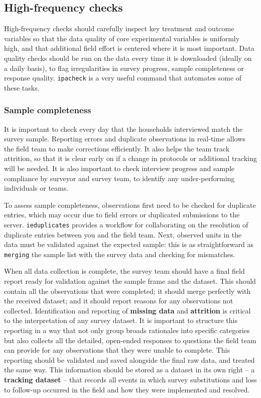 \subsection{High-frequency checks}
High-frequency checks should carefully inspect key treatment and outcome variables so that the data quality of core experimental variables is uniformly high,
and that additional field effort is centered where it is most important. Data quality checks should be run on the data every time it is downloaded (ideally on a daily basis), to flag irregularities in survey progress, sample completeness or response quality.
\texttt{ipacheck} 
is a very useful command that automates some of these tasks.


\subsubsection{Sample completeness}
It is important to check every day that the households interviewed match the survey sample. Reporting errors and duplicate observations in real-time allows the field team to make corrections efficiently.
It also helps the team track attrition, so that it is clear early on if a change in protocols or additional tracking will be needed. It is also important to check interview progress and sample compliance by surveyor and survey team, to identify any under-performing individuals or teams. 

To assess sample completeness, observations first need to be checked for duplicate entries, which may occur due to field errors or duplicated submissions to the server. 
\texttt{ieduplicates}
provides a workflow for collaborating on the resolution of duplicate entries between you and the field team.
Next, observed units in the data must be validated against the expected sample:
this is as straightforward as \texttt{merging} the sample list with the survey data and checking for mismatches.

When all data collection is complete,
the survey team should have a final field report
ready for validation against the sample frame and the dataset.
This should contain all the observations that were completed;
it should merge perfectly with the received dataset;
and it should report reasons for any observations not collected.
Identification and reporting of \textbf{missing data} and \textbf{attrition} is critical
to the interpretation of any survey dataset.
It is important to structure this reporting in a way that
not only group broads rationales into specific categories
but also collects all the detailed, open-ended responses to questions the field team can provide
for any observations that they were unable to complete.
This reporting should be validated and saved
alongside the final raw data, and treated the same way.
This information should be stored as a dataset in its own right
-- a \textbf{tracking dataset} --
that records all events in which survey substitutions
and loss to follow-up occurred in the field
and how they were implemented and resolved.


